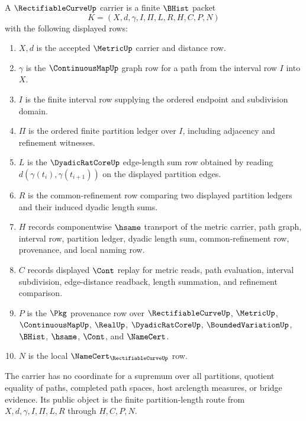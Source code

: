 \begin{definition}
\label{def:rectifiable-curve-carrier}
A $\RectifiableCurveUp$ carrier is a finite $\BHist$ packet
$$
K=(X,d,\gamma,I,\Pi,L,R,H,C,P,N)
$$
with the following displayed rows:
\begin{enumerate}
\item $X,d$ is the accepted $\MetricUp$ carrier and distance row.
\item $\gamma$ is the $\ContinuousMapUp$ graph row for a path from the interval row $I$ into $X$.
\item $I$ is the finite interval row supplying the ordered endpoint and subdivision domain.
\item $\Pi$ is the ordered finite partition ledger over $I$, including adjacency and refinement witnesses.
\item $L$ is the $\DyadicRatCoreUp$ edge-length sum row obtained by reading $d(\gamma(t_i),\gamma(t_{i+1}))$ on the displayed partition edges.
\item $R$ is the common-refinement row comparing two displayed partition ledgers and their induced dyadic length sums.
\item $H$ records componentwise $\hsame$ transport of the metric carrier, path graph, interval row, partition ledger, dyadic length sum, common-refinement row, provenance, and local naming row.
\item $C$ records displayed $\Cont$ replay for metric reads, path evaluation, interval subdivision, edge-distance readback, length summation, and refinement comparison.
\item $P$ is the $\Pkg$ provenance row over $\RectifiableCurveUp$, $\MetricUp$, $\ContinuousMapUp$, $\RealUp$, $\DyadicRatCoreUp$, $\BoundedVariationUp$, $\BHist$, $\hsame$, $\Cont$, and $\NameCert$.
\item $N$ is the local $\NameCert_{\RectifiableCurveUp}$ row.
\end{enumerate}
The carrier has no coordinate for a supremum over all partitions, quotient equality of paths, completed path spaces, host arclength measures, or bridge evidence. Its public object is the finite partition-length route from $X,d,\gamma,I,\Pi,L,R$ through $H,C,P,N$.
\end{definition}

